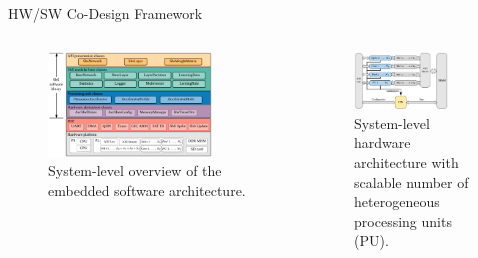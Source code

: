 \begin{frame}{HW/SW Co-Design Framework}
	\begin{columns}[t] %
		
		\begin{column}{0.5\textwidth}
			\begin{figure}
				\includegraphics[width=0.8\textwidth]{../chapters/sbs_accelerator/figures/sbs_software_component.pdf}
				\caption{\scriptsize System-level overview of the embedded software architecture.}
			\end{figure}
		\end{column}
		
		\begin{column}{0.5\textwidth}
			\begin{figure}
				\includegraphics[width=0.8\textwidth]{../chapters/sbs_accelerator/figures/sbs_hw.pdf} %
				\caption{\scriptsize System-level hardware architecture with scalable number of heterogeneous processing units (PU).}
			\end{figure}
		\end{column}
		
	\end{columns}
\end{frame}

